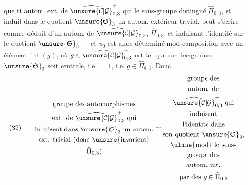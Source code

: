   que tt autom. ext.  de $\widehat{\unsure{\mathcal C|\mathcal G}}_{0,3}^{+}$ qui  le sous-groupe distingué $\widehat\Pi_{0,3}$, et induit dans le quotient $\unsure{\mathfrak S}_{3}$ un autom. extérieur trivial, peut s'écrire comme déduit d'un autom.  de $\widehat{\unsure{\mathcal C|\mathcal G}}_{0,3}^{+}$,  $\widehat\Pi_{0,3}$, et induisant l'\uline{identité} sur le quotient $\unsure{\mathfrak S}_{3}$ --- et $u_0$ est alors déterminé mod composition avec un élément $\operatorname{int}(g)$, où $g\in\widehat{\unsure{\mathcal C|\mathcal G}}_{0,3}^{+}$ est tel que son image dans $\unsure{\mathfrak S}_{3}$ soit centrale, i.e. $=1$, i.e. $g\in\widehat\Pi_{0,3}$. Donc
\[
(32)\qquad
\begin{gathered}
\text{groupe des automorphismes}\\
\text{ext. de $\widehat{\unsure{\mathcal C|\mathcal G}}_{0,3}^{+}$ qui}\\
\text{induisent dans $\unsure{\mathfrak S}_{3}$ un autom.}\\
\text{ext. trivial (donc \unsure{invarient}}\\
\widehat\Pi_{0,3})
\end{gathered}
\simeq
\begin{gathered}
\text{groupe des}\\
\text{autom. de}\\
\widehat{\unsure{\mathcal C|\mathcal G}}_{0,3}^{+}\text{ qui}\\
\text{induisent}\\
\text{l'identité dans}\\
\text{son quotient $\unsure{\mathfrak S}_{3}$,}\\
\text{\uline{mod} le sous-}\\
\text{groupe des}\\
\text{autom. int.}\\
\text{par des $g\in\widehat\Pi_{0,3}$}
\end{gathered}
\]


